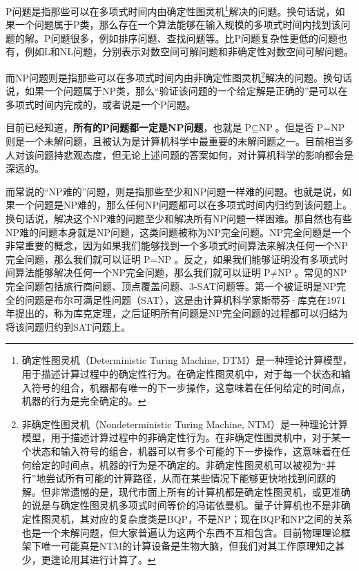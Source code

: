 \begin{reading}[NP完全问题简介]
    P问题是指那些可以在多项式时间内由确定性图灵机\footnote{确定性图灵机（Deterministic Turing Machine, DTM）是一种理论计算模型，用于描述计算过程中的确定性行为。在确定性图灵机中，对于每一个状态和输入符号的组合，机器都有唯一的下一步操作，这意味着在任何给定的时间点，机器的行为是完全确定的。}解决的问题。换句话说，如果一个问题属于P类，那么存在一个算法能够在输入规模的多项式时间内找到该问题的解。P问题很多，例如排序问题、查找问题等。比P问题复杂性更低的问题也有，例如L和NL问题，分别表示对数空间可解问题和非确定性对数空间可解问题。

    而NP问题则是指那些可以在多项式时间内由非确定性图灵机\footnote{非确定性图灵机（Nondeterministic Turing Machine, NTM）是一种理论计算模型，用于描述计算过程中的非确定性行为。在非确定性图灵机中，对于某一个状态和输入符号的组合，机器可以有多个可能的下一步操作，这意味着在任何给定的时间点，机器的行为是不确定的。非确定性图灵机可以被视为“并行”地尝试所有可能的计算路径，从而在某些情况下能够更快地找到问题的解。但非常遗憾的是，现代市面上所有的计算机都是确定性图灵机，或更准确的说是与确定性图灵机多项式时间等价的冯诺依曼机。量子计算机也不是非确定性图灵机，其对应的复杂度类是BQP，不是NP；现在BQP和NP之间的关系也是一个未解问题，但大家普遍认为这两个东西不互相包含。目前物理理论框架下唯一可能真是NTM的计算设备是生物大脑，但我们对其工作原理知之甚少，更遑论用其进行计算了。}解决的问题。换句话说，如果一个问题属于NP类，那么“验证该问题的一个给定解是正确的”是可以在多项式时间内完成的，或者说是一个P问题。

    目前已经知道，\textbf{所有的P问题都一定是NP问题}，也就是$\text{P} \subseteq \text{NP}$。但是否$\text{P} = \text{NP}$则是一个未解问题，且被认为是计算机科学中最重要的未解问题之一。目前相当多人对该问题持悲观态度，但无论上述问题的答案如何，对计算机科学的影响都会是深远的。

    而常说的“NP难的”问题，则是指那些至少和NP问题一样难的问题。也就是说，如果一个问题是NP难的，那么任何NP问题都可以在多项式时间内归约到该问题上。换句话说，解决这个NP难的问题至少和解决所有NP问题一样困难。那自然也有些NP难的问题本身就是NP问题，这类问题被称为NP完全问题。NP完全问题是一个非常重要的概念，因为如果我们能够找到一个多项式时间算法来解决任何一个NP完全问题，那么我们就可以证明$\text{P} = \text{NP}$。反之，如果我们能够证明没有多项式时间算法能够解决任何一个NP完全问题，那么我们就可以证明$\text{P} \neq \text{NP}$。常见的NP完全问题包括旅行商问题、顶点覆盖问题、3-SAT问题等。第一个被证明是NP完全的问题是布尔可满足性问题（SAT），这是由计算机科学家斯蒂芬·库克在1971年提出的，称为库克定理，之后证明所有问题是NP完全问题的过程都可以归结为将该问题归约到SAT问题上。


\end{reading}
